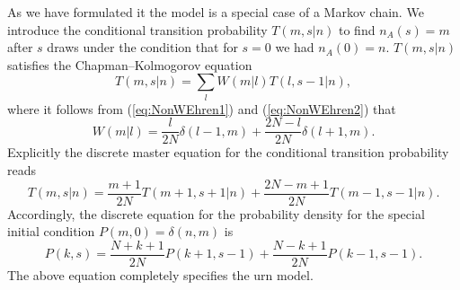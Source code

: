 As we have formulated it the model is a special case of a Markov chain. We
introduce the conditional transition probability $T(m,s|n)$ to find $n_A(s)=m$
after $s$ draws under the condition that for $s=0$ we had $n_A(0)=n$.
$T(m,s|n)$ satisfies the Chapman--Kolmogorov equation
\begin{displaymath}
  T(m,s|n) = \sum_l W(m|l) T(l,s-1|n),
\end{displaymath}
where it follows from (\ref{eq:NonWEhren1}) and (\ref{eq:NonWEhren2}) that
\begin{displaymath}
  W(m|l) = \frac{l}{2N} \delta(l-1,m) + \frac{2N-l}{2N} \delta(l+1,m).
\end{displaymath}
Explicitly the discrete master equation for the conditional 
transition probability reads
\begin{displaymath}
   T(m,s|n) = \frac{m+1}{2N} T(m+1,s+1|n) + \frac{2N-m+1}{2N} T(m-1,s-1|n).
\end{displaymath}
Accordingly, the discrete equation for the probability density 
for the special initial condition $P(m,0) = \delta(n,m)$ is
\begin{displaymath}
   P(k,s) = \frac{N+k+1}{2N} P(k+1,s-1) + \frac{N-k+1}{2N} P(k-1,s-1).
\end{displaymath}
The above equation completely specifies the urn model.

